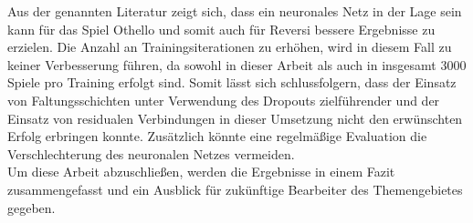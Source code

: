 \documentclass[12pt,a4paper,bibliography=totocnumbered,listof=totocnumbered]{article}
\begin{document}
Aus der genannten Literatur zeigt sich, dass ein neuronales Netz in der Lage sein kann für das Spiel Othello und somit auch für Reversi bessere Ergebnisse zu erzielen. Die Anzahl an Trainingsiterationen zu erhöhen, wird in diesem Fall zu keiner Verbesserung führen, da sowohl in dieser Arbeit als auch in \cite{Shantanu.2018} insgesamt 3000 Spiele pro Training erfolgt sind. Somit lässt sich schlussfolgern, dass der Einsatz von Faltungsschichten unter Verwendung des Dropouts zielführender und der Einsatz von residualen Verbindungen in dieser Umsetzung nicht den erwünschten Erfolg erbringen konnte. Zusätzlich könnte eine regelmäßige Evaluation die Verschlechterung des neuronalen Netzes vermeiden.\\
Um diese Arbeit abzuschließen, werden die Ergebnisse in einem Fazit zusammengefasst und ein Ausblick für zukünftige Bearbeiter des Themengebietes gegeben.


\pagebreak

\end{document}

